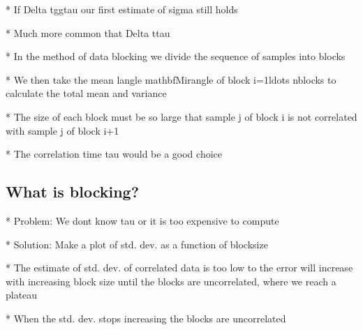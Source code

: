 \documentclass[letterpaper,10pt,english]{sphinxmanual}
\begin{document}
\begin{sphinxVerbatim}[commandchars=\\\{\}]
* If \PYGZdl{}\PYGZbs{}Delta t\PYGZbs{}gg\PYGZbs{}tau\PYGZdl{} our first estimate of \PYGZdl{}\PYGZbs{}sigma\PYGZdl{} still holds

* Much more common that \PYGZdl{}\PYGZbs{}Delta t\PYGZlt{}\PYGZbs{}tau\PYGZdl{}

* In the method of data blocking we divide the sequence of samples into blocks

* We then take the mean \PYGZdl{}\PYGZbs{}langle \PYGZbs{}mathbf\PYGZob{}M\PYGZcb{}\PYGZus{}i\PYGZbs{}rangle\PYGZdl{} of block \PYGZdl{}i=1\PYGZbs{}ldots n\PYGZus{}\PYGZob{}blocks\PYGZcb{}\PYGZdl{} to calculate the total mean and variance

* The size of each block must be so large that sample \PYGZdl{}j\PYGZdl{} of block \PYGZdl{}i\PYGZdl{} is not correlated with sample \PYGZdl{}j\PYGZdl{} of block \PYGZdl{}i+1\PYGZdl{}

* The correlation time \PYGZdl{}\PYGZbs{}tau\PYGZdl{} would be a good choice
\end{sphinxVerbatim}


\subsection{What is blocking?}
\label{\detokenize{chapter3:id18}}

\begin{sphinxVerbatim}[commandchars=\\\{\}]
* Problem: We don\PYGZsq{}t know \PYGZdl{}\PYGZbs{}tau\PYGZdl{} or it is too expensive to compute

* Solution: Make a plot of std. dev. as a function of blocksize

* The estimate of std. dev. of correlated data is too low \PYGZdl{}\PYGZbs{}to\PYGZdl{} the error will increase with increasing block size until the blocks are uncorrelated, where we reach a plateau

* When the std. dev. stops increasing the blocks are uncorrelated
\end{sphinxVerbatim}
\end{document}
